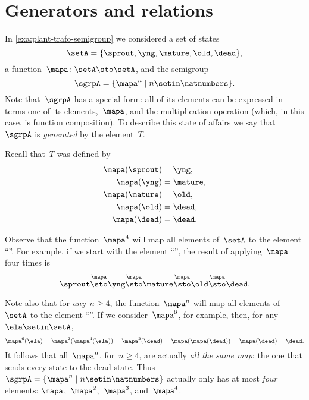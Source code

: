 
\section{Generators and relations}

In \cref{exa:plant-trafo-semigroup} we considered a set of states
%
\begin{equation}
    \setA= \{ \sprout, \yng, \mature, \old, \dead \},
\end{equation}
%
a function~$\mapa \colon \setA \sto \setA$, and the semigroup
%
\begin{equation}
    \label{eq:trafo-sgrp-one-gen}
    \sgrpA = \{ \mapa^n \mid n \setin \natnumbers \}.
\end{equation}
%
Note that~$\sgrpA$ has a special form: all of its elements can be expressed in terms one of its elements,~$\mapa$, and the multiplication operation (which, in this case, is function composition).
To describe this state of affairs we say that~$\sgrpA$ is \emph{generated} by the element~$T$.

Recall that~$T$ was defined by
%
\begin{align*}
    \mapa(\sprout) & =  \yng, \\
    \mapa(\yng)    & =  \mature, \\
    \mapa(\mature) & =  \old, \\
    \mapa( \old)   & = \dead, \\
    \mapa(\dead)   & = \dead.
\end{align*}

Observe that the function~$\mapa^4$ will map all elements of~$\setA$ to the element ``\dead''.
For example, if we start with the element ``\sprout'', the result of applying~$\mapa$ four times is
%
\begin{equation*}
    \sprout \overset{\mapa}{\sto} \yng \overset{\mapa}{\sto} \mature \overset{\mapa}{\sto} \old \overset{\mapa}{\sto} \dead.
\end{equation*}

Note also that for \emph{any}~$n \geq 4$, the function~$\mapa^n$ will map all elements of~$\setA$ to the element ``\dead''.
If we consider~$\mapa^6$, for example, then, for any~$\ela \setin \setA$,
%
\begin{equation*}
    \mapa^6(\ela) = \mapa^2(\mapa^4(\ela)) = \mapa^2(\dead) = \mapa(\mapa(\dead)) = \mapa(\dead) = \dead.
\end{equation*}
%
It follows that all~$\mapa^n$, for~$n \geq 4$, are actually \emph{all the same map}: the one that sends every state to the dead state.
Thus~$\sgrpA = \{ \mapa^n \mid n \setin \natnumbers \}$ actually only has at most \emph{four} elements: $\mapa$,~$\mapa^2$,~$\mapa^3$, and~$\mapa^4$.

